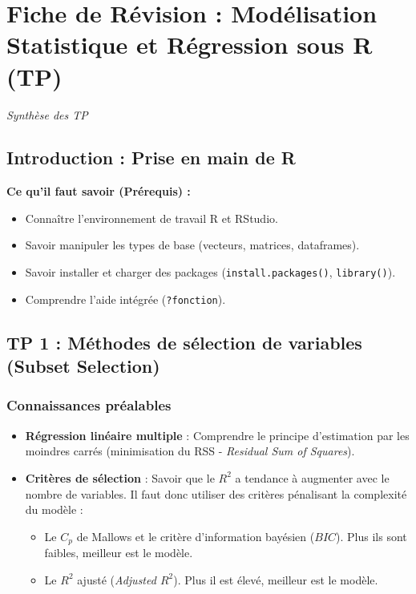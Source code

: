 \chapter{Fiche de Révision : Modélisation Statistique et Régression sous R (TP)}
\textit{Synthèse des TP}

\section*{Introduction : Prise en main de R}
\textbf{Ce qu'il faut savoir (Prérequis) :}
\begin{itemize}
    \item Connaître l'environnement de travail R et RStudio.
    \item Savoir manipuler les types de base (vecteurs, matrices, dataframes).
    \item Savoir installer et charger des packages (\texttt{install.packages()}, \texttt{library()}).
    \item Comprendre l'aide intégrée (\texttt{?fonction}).
\end{itemize}

\hrulefill

\section{TP 1 : Méthodes de sélection de variables (Subset Selection)}

\subsection{Connaissances préalables}
\begin{itemize}
    \item \textbf{Régression linéaire multiple} : Comprendre le principe d'estimation par les moindres carrés (minimisation du RSS - \textit{Residual Sum of Squares}).
    \item \textbf{Critères de sélection} : Savoir que le $R^2$ a tendance à augmenter avec le nombre de variables. Il faut donc utiliser des critères pénalisant la complexité du modèle :
    \begin{itemize}
        \item Le $C_p$ de Mallows et le critère d'information bayésien ($BIC$). Plus ils sont faibles, meilleur est le modèle.
        \item Le $R^2$ ajusté (\textit{Adjusted $R^2$}). Plus il est élevé, meilleur est le modèle.
    \end{itemize}
\end{itemize}

